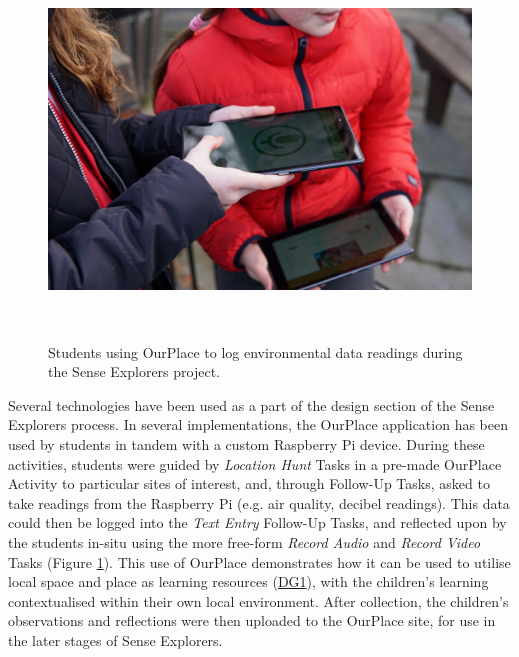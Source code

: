 \begin{figure}
  \centering
  \includegraphics[width=0.8\columnwidth]{images/chapter07/senseExplorers.jpg}
  \caption[Students using OurPlace to log findings during Sense Explorers]{Students using OurPlace to log environmental data readings during the Sense Explorers project.}~\label{fig:SenseExplorers}
\end{figure}

Several technologies have been used as a part of the design section of the Sense Explorers process. In several implementations, the OurPlace application has been used by students in tandem with a custom Raspberry Pi device. During these activities, students were guided by \textit{Location Hunt} Tasks in a pre-made OurPlace Activity to particular sites of interest, and, through Follow-Up Tasks, asked to take readings from the Raspberry Pi (e.g. air quality, decibel readings). This data could then be logged into the \textit{Text Entry} Follow-Up Tasks, and reflected upon by the students in-situ using the more free-form \textit{Record Audio} and \textit{Record Video} Tasks (Figure \ref{fig:SenseExplorers}). This use of OurPlace demonstrates how it can be used to utilise local space and place as learning resources (\hyperref[DG1]{DG1}), with the children's learning contextualised within their own local environment. After collection, the children's observations and reflections were then uploaded to the OurPlace site, for use in the later stages of Sense Explorers.

